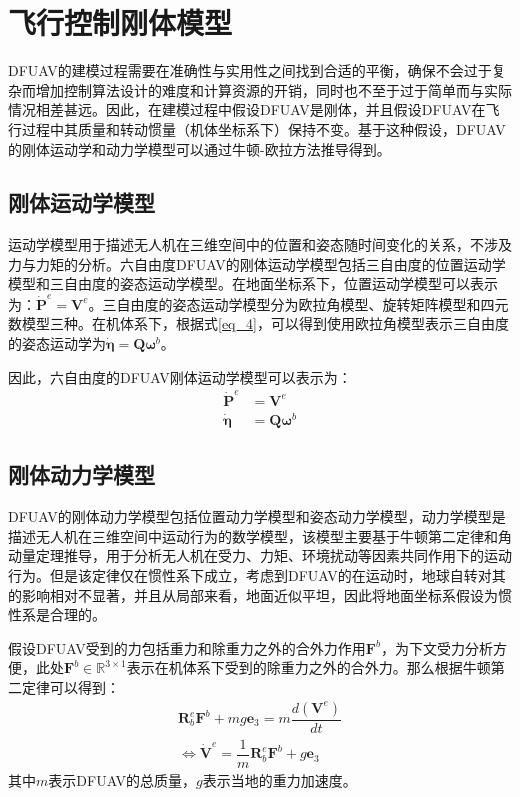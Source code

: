 \section{飞行控制刚体模型}

DFUAV的建模过程需要在准确性与实用性之间找到合适的平衡，确保不会过于复杂而增加控制算法设计的难度和计算资源的开销，同时也不至于过于简单而与实际情况相差甚远。因此，在建模过程中假设DFUAV是刚体，并且假设DFUAV在飞行过程中其质量和转动惯量（机体坐标系下）保持不变。基于这种假设，DFUAV的刚体运动学和动力学模型可以通过牛顿-欧拉方法推导得到。

\subsection{刚体运动学模型}

运动学模型用于描述无人机在三维空间中的位置和姿态随时间变化的关系，不涉及力与力矩的分析。六自由度DFUAV的刚体运动学模型包括三自由度的位置运动学模型和三自由度的姿态运动学模型。在地面坐标系下，位置运动学模型可以表示为：$\boldsymbol{\dot{P}}^{e} = \boldsymbol{V}^{e}$。三自由度的姿态运动学模型分为欧拉角模型、旋转矩阵模型和四元数模型三种。在机体系下，根据式\eqref{eq_4}，可以得到使用欧拉角模型表示三自由度的姿态运动学为$\dot{\boldsymbol{\eta}}=\boldsymbol{Q}\boldsymbol{\omega}^b$。

因此，六自由度的DFUAV刚体运动学模型可以表示为：
\begin{equation}
    \begin{aligned}
    \boldsymbol{\dot{P}}^{e} &= \boldsymbol{V}^{e} \\
    \dot{\boldsymbol{\eta}}&=\boldsymbol{Q}\boldsymbol{\omega}^b
    \end{aligned}
    \label{eq_6}
\end{equation}

\subsection{刚体动力学模型}

DFUAV的刚体动力学模型包括位置动力学模型和姿态动力学模型，动力学模型是描述无人机在三维空间中运动行为的数学模型，该模型主要基于牛顿第二定律和角动量定理推导，用于分析无人机在受力、力矩、环境扰动等因素共同作用下的运动行为。但是该定律仅在惯性系下成立，考虑到DFUAV的在运动时，地球自转对其的影响相对不显著，并且从局部来看，地面近似平坦，因此将地面坐标系假设为惯性系是合理的。

假设DFUAV受到的力包括重力和除重力之外的合外力作用$\boldsymbol{F}^b$，为下文受力分析方便，此处$\boldsymbol{F}^b\in\mathbb{R}^{3\times1}$表示在机体系下受到的除重力之外的合外力。那么根据牛顿第二定律可以得到：
\begin{equation}
    \begin{gathered}
    \boldsymbol{R}_b^e\boldsymbol{F}^b + mg\boldsymbol{e}_3 = m\dfrac{d({\boldsymbol{V}}^e)}{dt}
    \\
    \Leftrightarrow\dot{\boldsymbol{V}}^e=\dfrac{1}{m}\boldsymbol{R}_b^e\boldsymbol{F}^b + g\boldsymbol{e}_3 
    \label{eq_7}
    \end{gathered}
\end{equation}
其中$m$表示DFUAV的总质量，$g$表示当地的重力加速度。

